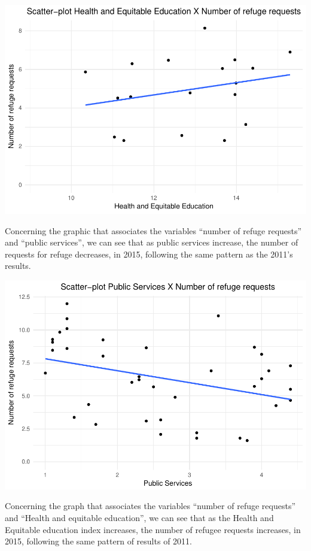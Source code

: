 \documentclass[]{elsarticle} %
\makeatletter
\def\maxwidth{\ifdim\Gin@nat@width>\linewidth\linewidth
\else\Gin@nat@width\fi}
\let\Oldincludegraphics\includegraphics
\renewcommand{\includegraphics}[1]{\Oldincludegraphics[width=\maxwidth]{#1}}
\makeatother
\begin{document}
\includegraphics{refugees-stephanie_files/figure-latex/model_1_2-1.pdf}

Concerning the graphic that associates the variables ``number of refuge
requests'' and ``public services'', we can see that as public services
increase, the number of requests for refuge decreases, in 2015,
following the same pattern as the 2011's results.

\includegraphics{refugees-stephanie_files/figure-latex/model_1_3-1.pdf}

Concerning the graph that associates the variables ``number of refuge
requests'' and ``Health and equitable education'', we can see that as
the Health and Equitable education index increases, the number of
refugee requests increases, in 2015, following the same pattern of
results of 2011.
\end{document}
